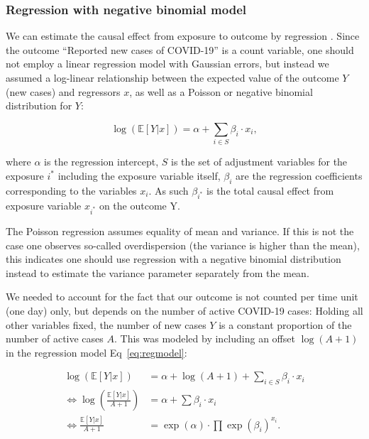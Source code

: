 \documentclass[10pt,letterpaper]{article}
\begin{document}
\subsubsection*{Regression with negative binomial
model}\label{regression-with-negative-binomial-model}

We can estimate the causal effect from exposure to outcome by regression
\cite{pearl2009causality}. Since the outcome ``Reported new cases of
COVID-19'' is a count variable, one should not employ a linear
regression model with Gaussian errors, but instead we assumed a
log-linear relationship between the expected value of the outcome \(Y\)
(new cases) and regressors \(x\), as well as a Poisson or negative
binomial distribution for \(Y\):

\begin{equation}
\log(\mathbb{E}[Y|x]) = \alpha + \sum_{i\in S}\beta_i\cdot x_{i}, \label{eq:regmodel}
\end{equation}

where \(\alpha\) is the regression intercept, \(S\) is the set of
adjustment variables for the exposure \(i^{\ast}\) including the
exposure variable itself, \(\beta_i\) are the regression coefficients
corresponding to the variables \(x_i\). As such \(\beta_{i^{\ast}}\) is
the total causal effect from exposure variable \(x_{i^{\ast}}\) on the
outcome Y.

The Poisson regression assumes equality of mean and variance. If this is
not the case one observes so-called overdispersion (the variance is
higher than the mean), this indicates one should use regression with a
negative binomial distribution instead to estimate the variance
parameter separately from the mean.

We needed to account for the fact that our outcome is not counted per
time unit (one day) only, but depends on the number of active COVID-19
cases: Holding all other variables fixed, the number of new cases \(Y\)
is a constant proportion of the number of active cases \(A\). This was
modeled by including an offset \(\log(A+1)\) in the regression model Eq~\eqref{eq:regmodel}:

\begin{align}
\log(\mathbb{E}[Y|x]) &= \alpha + \log(A+1) + \sum_{i\in S}\beta_i\cdot x_{i} \nonumber \\
\Leftrightarrow \log(\frac{\mathbb{E}[Y|x]}{A+1}) &= \alpha + \sum\beta_i\cdot x_{i} \label{eq:logratemodel} \\
\Leftrightarrow \frac{\mathbb{E}[Y|x]}{A+1} &= \exp(\alpha)\cdot \prod \exp(\beta_i)^{x_i}. \label{eq:ratechange}
\end{align}
\end{document}
